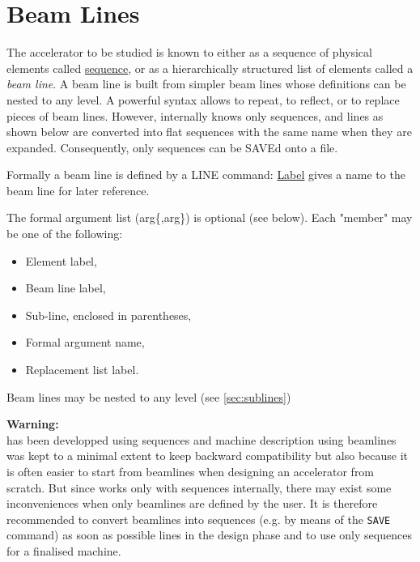 

\chapter{Beam Lines}
\label{chap:beamlines}

The accelerator to be studied is known to \madx either as a sequence of
physical elements called \href{sequence.html}{sequence}, or as a
hierarchically structured list of elements called a \emph{beam line}. 
A beam line is built from simpler beam lines whose definitions can be
nested to any level. A powerful syntax allows to repeat, to reflect, or
to replace pieces of beam lines. However, internally \madx knows only
sequences, and lines as shown below are converted into flat sequences
with the same name when they are expanded. Consequently, only sequences
can be SAVEd onto a file.

Formally a beam line is defined by a LINE command: 
\href{label.html}{Label} gives a name to the beam line for later reference. 

The formal argument list (arg\{,arg\}) is optional (see below). Each
"member" may be one of the following:  
\begin{itemize}
\item  Element label, 
\item  Beam line label, 
\item  Sub-line, enclosed in parentheses, 
\item  Formal argument name, 
\item  Replacement list label. 
\end{itemize} 

Beam lines may be nested to any level (see \ref{sec:sublines})  


{\bf Warning:}\\
\madx has been developped using sequences and machine description using
beamlines was kept to a minimal extent to keep backward compatibility
but also because it is often easier to start from beamlines when
designing an accelerator from scratch.   
But since \madx works only with sequences internally, there may exist
some inconveniences when only beamlines are defined by the user. It is
therefore recommended to convert beamlines into sequences (e.g. by means
of the \texttt{SAVE} command) as soon as possible lines in the design
phase and to use only sequences for a finalised machine.     

